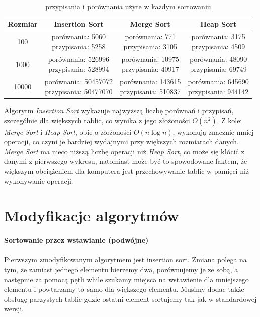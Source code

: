 \documentclass{article}
\begin{document}
	\begin{table}[H]
		\raggedright
		\begin{tabular}{|c|c|c|c|}
			\hline
			\textbf{Rozmiar} & \textbf{Insertion Sort} & \textbf{Merge Sort} & \textbf{Heap Sort} \\ \hline
			100 & \makecell{porównania: 5060 \\ przypisania: 5258} & \makecell{porównania: 771 \\ przypisania: 3105} & \makecell{porównania: 3175 \\ przypisania: 4509} \\ \hline
			1000 & \makecell{porównania: 526996 \\ przypisania: 528994} & \makecell{porównania: 10975 \\ przypisania: 40917} & \makecell{porównania: 48090 \\ przypisania: 69749} \\ \hline
			10000 & \makecell{porównania: 50457072 \\ przypisania: 50477070} & \makecell{porównania: 143615 \\ przypisania: 510837} & \makecell{porównania: 645690 \\ przypisania: 944142} \\ \hline
		\end{tabular}
		\caption{przypisania i porównania użyte w każdym sortowaniu}
	\end{table}
	
	Algorytm \textit{Insertion Sort} wykazuje najwyższą liczbę porównań i przypisań, szczególnie dla większych tablic, co wynika z jego złożoności $O(n^2)$. Z kolei \textit{Merge Sort} i \textit{Heap Sort}, obie o złożoności $O(n \log n)$, wykonują znacznie mniej operacji, co czyni je bardziej wydajnymi przy większych rozmiarach danych. \textit{Merge Sort} ma nieco niższą liczbę operacji niż \textit{Heap Sort}, co może się kłócić z danymi z pierwszego wykresu, natomiast może być to spowodowane faktem, że większym obciążeniem dla komputera jest przechowywanie tablic w pamięci niż wykonywanie operacji. 
	
	
	\section{Modyfikacje algorytmów}
	\paragraph{Sortowanie przez wstawianie (podwójne)\\}
	Pierwszym zmodyfikowanym algorytmem jest insertion sort. Zmiana polega na tym, że zamiast jednego elementu bierzemy dwa, porównujemy je ze sobą, a następnie za pomocą pętli while szukamy miejsca na wstawienie dla mniejszego elementu i powtarzamy to samo dla większego elementu. Musimy dodac także obsługę parzystych tablic gdzie ostatni element sortujemy tak jak w standardowej wersji.
	
\end{document}
